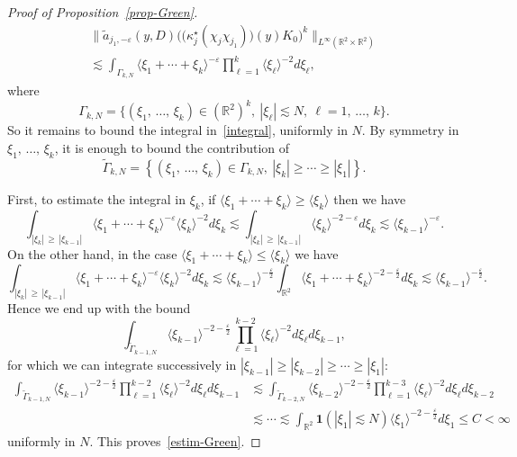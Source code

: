 \documentclass[AHL,Unicode,longabstracts,published]{cedram}
\newcommand{\R}{\mathbb{R}}
\newcommand{\ind}{\mathbf{1}}
\newcommand{\eps}{\varepsilon}
\newcommand{\kk}{\kappa}
\newcommand{\wt}{\widetilde}
\newcommand{\les}{\lesssim}
\newcommand{\jb}[1] {\langle #1 \rangle}
\begin{document}
\begin{proof}[Proof of Proposition~\ref{prop-Green}]
\begin{multline}\label{integral}
\Big\|\wt a_{j_1,-\eps}(y,D)\Big(\big(\kk_j^\star(\chi_j\chi_{j_1})\big)(y)K_0\Big)^k\Big\|_{L^{\infty}(\R^2\times\R^2)}\\
\les \int_{\Gamma_{k,N}}\jb{\xi_1+\cdots+\xi_k}^{-\eps}\prod_{\ell=1}^k\jb{\xi_\ell}^{-2}d\xi_\ell,
\end{multline}
where
\begin{equation*}
\Gamma_{k,N}=\big\{(\xi_1,\,\dots,\,\xi_k)\in \left(\R^2\right)^k,~|\xi_\ell|\les N,~\ell=1,\,\dots,\,k\big\}.
\end{equation*}
So it remains to bound the integral in~\eqref{integral}, uniformly in $N$. By symmetry in $\xi_1,\,\dots,\,\xi_k$, it is enough to bound the contribution of
\begin{equation*}
\widetilde{\Gamma}_{k,N}=\left\{(\xi_1,\,\dots,\,\xi_k)\in\Gamma_{k,N},~|\xi_k|\geq \cdots\geq |\xi_1|\right\}.
\end{equation*}

First, to estimate the integral in $\xi_k$, if $\jb{\xi_1+\cdots+\xi_k}\geq \jb{\xi_k}$ then we have
\begin{equation*}
\int_{|\xi_k|\,\geq\,|\xi_{k-1}|}\jb{\xi_1+\cdots+\xi_k}^{-\varepsilon}\jb{\xi_k}^{-2}d\xi_k\les \int_{|\xi_k|\,\geq\,|\xi_{k-1}|}\jb{\xi_k}^{-2-\varepsilon}d\xi_k\les \jb{\xi_{k-1}}^{-\varepsilon}.
\end{equation*}
On the other hand, in the case $\jb{\xi_1+\cdots+\xi_k}\leq \jb{\xi_k}$ we have
\begin{equation*}
\int_{|\xi_k|\,\geq\,|\xi_{k-1}|}\jb{\xi_1+\cdots+\xi_k}^{-\varepsilon}\jb{\xi_k}^{-2}d\xi_k\les \jb{\xi_{k-1}}^{-\frac{\varepsilon}2}\int_{\R^2}\jb{\xi_1+\cdots+\xi_k}^{-2-\frac{\varepsilon}2}d\xi_k\les \jb{\xi_{k-1}}^{-\frac{\varepsilon}2}.
\end{equation*}
Hence we end up with the bound
\begin{equation*}
\int_{\widetilde{\Gamma}_{k-1,N}}\jb{\xi_{k-1}}^{-2-\frac{\varepsilon}2}\prod_{\ell=1}^{k-2}\jb{\xi_\ell}^{-2}d\xi_\ell d\xi_{k-1},
\end{equation*}
for which we can integrate successively in $|\xi_{k-1}|\geq |\xi_{k-2}|\geq \cdots\geq |\xi_1|$:
\begin{align*}
\int_{\widetilde{\Gamma}_{k-1,N}}\jb{\xi_{k-1}}^{-2-\frac{\varepsilon}2}\prod_{\ell=1}^{k-2}\jb{\xi_\ell}^{-2}d\xi_\ell d\xi_{k-1}&\les \int_{\widetilde{\Gamma}_{k-2,N}}\jb{\xi_{k-2}}^{-2-\frac{\varepsilon}2}\prod_{\ell=1}^{k-3}\jb{\xi_\ell}^{-2}d\xi_\ell d\xi_{k-2}\\
&\les \cdots \les \int_{\R^2}\ind(|\xi_1|\les N)\jb{\xi_1}^{-2-\frac\eps2}d\xi_1 \leq C <\infty
\end{align*}
uniformly in $N$. This proves~\eqref{estim-Green}.
\vspace{4pt}


\end{proof}
\end{document}
